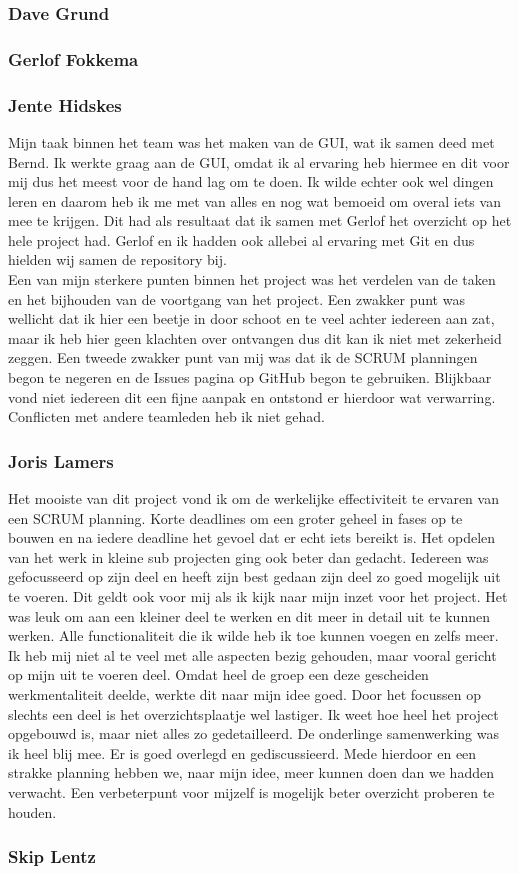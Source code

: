 \documentclass[a4paper,11pt]{article}
\begin{document}
\subsubsection{Dave Grund}
\subsubsection{Gerlof Fokkema}
\subsubsection{Jente Hidskes}
Mijn taak binnen het team was het maken van de GUI, wat ik samen deed met Bernd. Ik werkte graag aan de GUI, omdat ik al ervaring heb hiermee en dit voor mij dus het meest voor de hand lag om te doen. Ik wilde echter ook wel dingen leren en daarom heb ik me met van alles en nog wat bemoeid om overal iets van mee te krijgen. Dit had als resultaat dat ik samen met Gerlof het overzicht op het hele project had. Gerlof en ik hadden ook allebei al ervaring met Git en dus hielden wij samen de repository bij.\\
Een van mijn sterkere punten binnen het project was het verdelen van de taken en het bijhouden van de voortgang van het project. Een zwakker punt was wellicht dat ik hier een beetje in door schoot en te veel achter iedereen aan zat, maar ik heb hier geen klachten over ontvangen dus dit kan ik niet met zekerheid zeggen. Een tweede zwakker punt van mij was dat ik de SCRUM planningen begon te negeren en de Issues pagina op GitHub begon te gebruiken. Blijkbaar vond niet iedereen dit een fijne aanpak en ontstond er hierdoor wat verwarring. Conflicten met andere teamleden heb ik niet gehad.
\subsubsection{Joris Lamers}
Het mooiste van dit project vond ik om de werkelijke effectiviteit te ervaren van een SCRUM planning. Korte deadlines om een groter geheel in fases op te bouwen en na iedere deadline het gevoel dat er echt iets bereikt is. Het opdelen van het werk in kleine sub projecten ging ook beter dan gedacht. Iedereen was gefocusseerd op zijn deel en heeft zijn best gedaan zijn deel zo goed mogelijk uit te voeren. Dit geldt ook voor mij als ik kijk naar mijn inzet voor het project. Het was leuk om aan een kleiner deel te werken en dit meer in detail uit te kunnen werken. Alle functionaliteit die ik wilde heb ik toe kunnen voegen en zelfs meer. Ik heb mij niet al te veel met alle aspecten bezig gehouden, maar vooral gericht op mijn uit te voeren deel. Omdat heel de groep een deze gescheiden werkmentaliteit deelde, werkte dit naar mijn idee goed. Door het focussen op slechts een deel is het overzichtsplaatje wel lastiger. Ik weet hoe heel het project opgebouwd is, maar niet alles zo gedetailleerd. De onderlinge samenwerking was ik heel blij mee. Er is goed overlegd en gediscussieerd. Mede hierdoor en een strakke planning hebben we, naar mijn idee, meer kunnen doen dan we hadden verwacht. Een verbeterpunt voor mijzelf is mogelijk beter overzicht proberen te houden.
\subsubsection{Skip Lentz}
\end{document}
